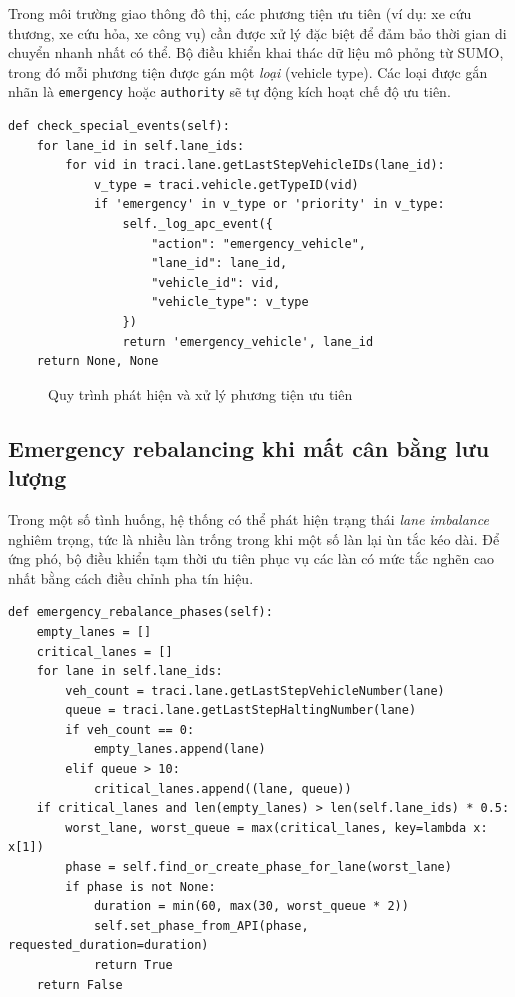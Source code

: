 Trong môi trường giao thông đô thị, các phương tiện ưu tiên (ví dụ: xe cứu thương, xe cứu hỏa, xe công vụ) cần được xử lý đặc biệt để đảm bảo thời gian di chuyển nhanh nhất có thể. Bộ điều khiển khai thác dữ liệu mô phỏng từ SUMO, trong đó mỗi phương tiện được gán một \textit{loại} (vehicle type). Các loại được gắn nhãn là \texttt{emergency} hoặc \texttt{authority} sẽ tự động kích hoạt chế độ ưu tiên.

\begin{lstlisting}[style=py,caption={Thuật toán phát hiện xe ưu tiên}]
def check_special_events(self):
    for lane_id in self.lane_ids:
        for vid in traci.lane.getLastStepVehicleIDs(lane_id):
            v_type = traci.vehicle.getTypeID(vid)
            if 'emergency' in v_type or 'priority' in v_type:
                self._log_apc_event({
                    "action": "emergency_vehicle",
                    "lane_id": lane_id,
                    "vehicle_id": vid,
                    "vehicle_type": v_type
                })
                return 'emergency_vehicle', lane_id
    return None, None
\end{lstlisting}

\begin{figure}[H]
    \centering
    \caption{Quy trình phát hiện và xử lý phương tiện ưu tiên}
\end{figure}

\subsection{Emergency rebalancing khi mất cân bằng lưu lượng}

Trong một số tình huống, hệ thống có thể phát hiện trạng thái \textit{lane imbalance} nghiêm trọng, tức là nhiều làn trống trong khi một số làn lại ùn tắc kéo dài. Để ứng phó, bộ điều khiển tạm thời ưu tiên phục vụ các làn có mức tắc nghẽn cao nhất bằng cách điều chỉnh pha tín hiệu.

\begin{lstlisting}[style=py,caption={Cơ chế emergency rebalancing khi lane imbalance}]
def emergency_rebalance_phases(self):
    empty_lanes = []
    critical_lanes = []
    for lane in self.lane_ids:
        veh_count = traci.lane.getLastStepVehicleNumber(lane)
        queue = traci.lane.getLastStepHaltingNumber(lane)
        if veh_count == 0:
            empty_lanes.append(lane)
        elif queue > 10:
            critical_lanes.append((lane, queue))
    if critical_lanes and len(empty_lanes) > len(self.lane_ids) * 0.5:
        worst_lane, worst_queue = max(critical_lanes, key=lambda x: x[1])
        phase = self.find_or_create_phase_for_lane(worst_lane)
        if phase is not None:
            duration = min(60, max(30, worst_queue * 2))
            self.set_phase_from_API(phase, requested_duration=duration)
            return True
    return False
\end{lstlisting}

